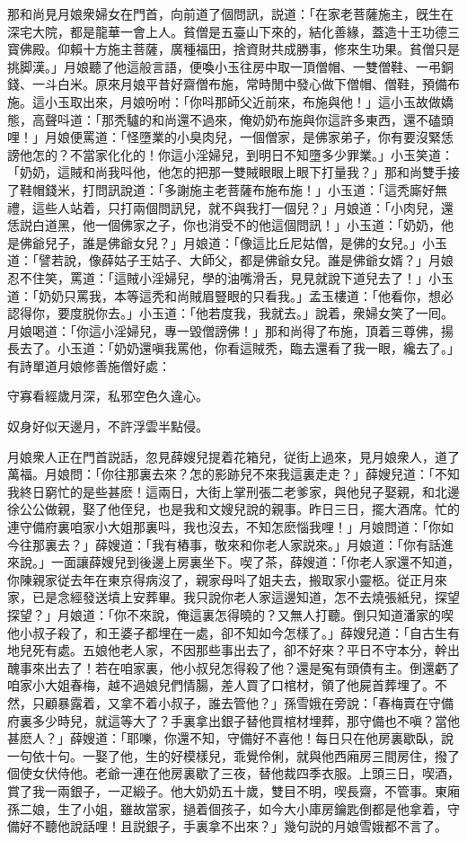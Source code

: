 那和尚見月娘衆婦女在門首，向前道了個問訊，説道：「在家老菩薩施主，旣生在深宅大院，都是龍華一會上人。貧僧是五臺山下來的，結化善緣，蓋造十王功德三寳佛殿。仰賴十方施主菩薩，廣種福田，捨資財共成勝事，修來生功果。貧僧只是挑脚漢。」月娘聽了他這般言語，便喚小玉往房中取一頂僧帽、一雙僧鞋、一弔銅錢、一斗白米。原來月娘平昔好齋僧布施，常時閒中發心做下僧帽、僧鞋，預備布施。這小玉取出來，月娘吩咐：「你呌那師父近前來，布施與他！」這小玉故做嬌態，高聲呌道：「那秃驢的和尚還不過來，俺奶奶布施與你這許多東西，還不磕頭哩！」月娘便罵道：「怪墮業的小臭肉兒，一個僧家，是佛家弟子，你有要沒緊恁謗他怎的？不當家化化的！你這小淫婦兒，到明日不知墮多少罪業。」小玉笑道：「奶奶，這賊和尚我呌他，他怎的把那一雙賊眼眼上眼下打量我？」那和尚雙手接了鞋帽錢米，打問訊說道：「多謝施主老菩薩布施布施！」小玉道：「這秃廝好無禮，這些人站着，只打兩個問訊兒，就不與我打一個兒？」月娘道：「小肉兒，還恁説白道黑，他一個佛家之子，你也消受不的他這個問訊！」小玉道：「奶奶，他是佛爺兒子，誰是佛爺女兒？」月娘道：「像這比丘尼姑僧，是佛的女兒。」小玉道：「譬若說，像薛姑子王姑子、大師父，都是佛爺女兒。誰是佛爺女婿？」月娘忍不住笑，罵道：「這賊小淫婦兒，學的油嘴滑舌，見見就說下道兒去了！」小玉道：「奶奶只罵我，本等這秃和尚賊眉豎眼的只看我。」孟玉樓道：「他看你，想必認得你，要度脱你去。」小玉道：「他若度我，我就去。」說着，衆婦女笑了一囘。月娘喝道：「你這小淫婦兒，專一毀僧謗佛！」那和尚得了布施，頂着三尊佛，揚長去了。小玉道：「奶奶還嗔我罵他，你看這賊秃，臨去還看了我一眼，纔去了。」有詩單道月娘修善施僧好處：

\begin{myquote}
守寡看經歲月深，私邪空色久違心。

奴身好似天邊月，不許浮雲半點侵。
\end{myquote}

月娘衆人正在門首説話，忽見薛嫂兒提着花箱兒，従街上過來，見月娘衆人，道了萬福。月娘問：「你往那裏去來？怎的影跡兒不來我這裏走走？」薛嫂兒道：「不知我終日窮忙的是些甚麽！這兩日，大街上掌刑張二老爹家，與他兒子娶親，和北邊徐公公做親，娶了他侄兒，也是我和文嫂兒說的親事。昨日三日，擺大酒席。忙的連守備府裏咱家小大姐那裏呌，我也沒去，不知怎麽惱我哩！」月娘問道：「你如今往那裏去？」薛嫂道：「我有樁事，敬來和你老人家説來。」月娘道：「你有話進來說。」一面讓薛嫂兒到後邊上房裏坐下。喫了茶，薛嫂道：「你老人家還不知道，你陳親家従去年在東京得病沒了，親家母呌了姐夫去，搬取家小靈柩。従正月來家，已是念經發送墳上安葬畢。我只說你老人家這邊知道，怎不去燒張紙兒，探望探望？」月娘道：「你不來說，俺這裏怎得曉的？又無人打聽。倒只知道潘家的喫他小叔子殺了，和王婆子都埋在一處，卻不知如今怎樣了。」薛嫂兒道：「自古生有地兒死有處。五娘他老人家，不因那些事出去了，卻不好來？平日不守本分，幹出醜事來出去了！若在咱家裏，他小叔兒怎得殺了他？還是寃有頭債有主。倒還虧了咱家小大姐春梅，越不過娘兒們情腸，差人買了口棺材，領了他屍首葬埋了。不然，只顧暴露着，又拿不着小叔子，誰去管他？」孫雪娥在旁說：「春梅賣在守備府裏多少時兒，就這等大了？手裏拿出銀子替他買棺材埋葬，那守備也不嗔？當他甚麽人？」薛嫂道：「耶嚛，你還不知，守備好不喜他！每日只在他房裏歇臥，說一句依十句。一娶了他，生的好模樣兒，乖覺伶俐，就與他西廂房三間房住，撥了個使女伏侍他。老爺一連在他房裏歇了三夜，替他裁四季衣服。上頭三日，喫酒，賞了我一兩銀子，一疋緞子。他大奶奶五十歲，雙目不明，喫長齋，不管事。東廂孫二娘，生了小姐，雖故當家，撾着個孩子，如今大小庫房鑰匙倒都是他拿着，守備好不聽他說話哩！且説銀子，手裏拿不出來？」幾句説的月娘雪娥都不言了。

